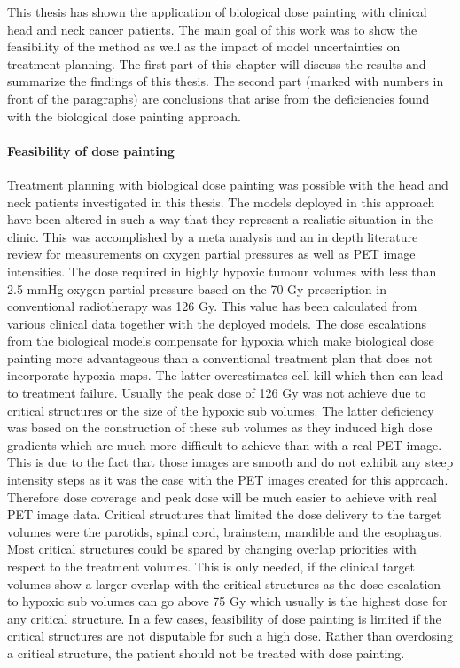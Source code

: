 This thesis has shown the application of biological dose painting with clinical head and neck cancer patients. The main goal of this work was to show the feasibility of the method as well as the impact of model uncertainties on treatment planning. The first part of this chapter will discuss the results and summarize the findings of this thesis. The second part (marked with numbers in front of the paragraphs) are conclusions that arise from the deficiencies found with the biological dose painting approach.
\paragraph{Feasibility of dose painting} Treatment planning with biological dose painting was possible with the head and neck patients investigated in this thesis. The models deployed in this approach have been altered in such a way that they represent a realistic situation in the clinic. This was accomplished by a meta analysis and an in depth literature review for measurements on oxygen partial pressures as well as PET image intensities. The dose required in highly hypoxic tumour volumes with less than 2.5 mmHg oxygen partial pressure based on the 70 Gy prescription in conventional radiotherapy was 126 Gy. This value has been calculated from various clinical data together with the deployed models. The dose escalations from the biological models compensate for hypoxia which make biological dose painting more advantageous than a conventional treatment plan that does not incorporate hypoxia maps. The latter overestimates cell kill which then can lead to treatment failure. Usually the peak dose of 126 Gy was not achieve due to critical structures or the size of the hypoxic sub volumes. The latter deficiency was based on the construction of these sub volumes as they induced high dose gradients which are much more difficult to achieve than with a real PET image. This is due to the fact that those images are smooth and do not exhibit any steep intensity steps as it was the case with the PET images created for this approach. Therefore dose coverage and peak dose will be much easier to achieve with real PET image data. Critical structures that limited the dose delivery to the target volumes were the parotids, spinal cord, brainstem, mandible and the esophagus. Most critical structures could be spared by changing overlap priorities with respect to the treatment volumes. This is only needed, if the clinical target volumes show a larger overlap with the critical structures as the dose escalation to hypoxic sub volumes can go above 75 Gy which usually is the highest dose for any critical structure. In a few cases, feasibility of dose painting is limited if the critical structures are not disputable for such a high dose. Rather than overdosing a critical structure, the patient should not be treated with dose painting.

